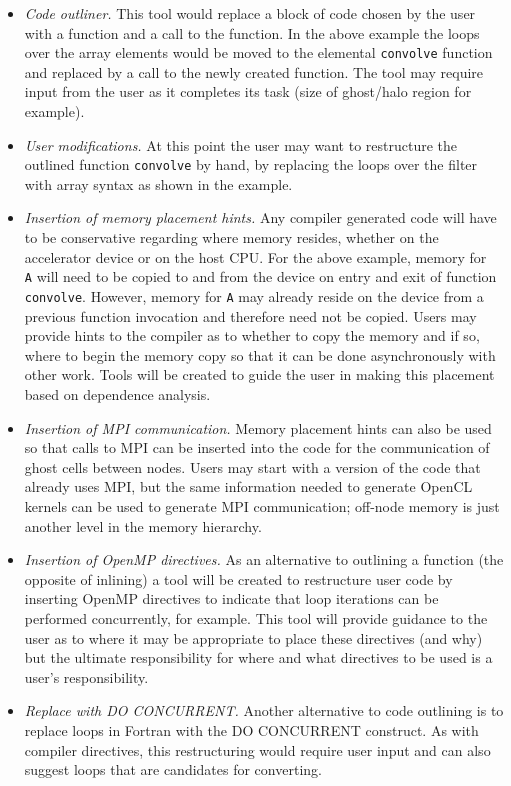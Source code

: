 \begin{itemize}

\item \emph{Code outliner.}  This tool would replace a block of code chosen by
the user with a function and a call to the function.  In the above example the
loops over the array elements would be moved to the elemental {\tt convolve}
function and replaced by a call to the newly created function.  The tool may
require input from the user as it completes its task (size of ghost/halo region
for example).

\item \emph{User modifications.} At this point the user may want to restructure
the outlined function {\tt convolve} by hand, by replacing the loops over the
filter with array syntax as shown in the example.

\item \emph{Insertion of memory placement hints.}  Any compiler generated code
will have to be conservative regarding where memory resides, whether on the
accelerator device or on the host CPU.  For the above example, memory for {\tt
A} will need to be copied to and from the device on entry and exit of function
{\tt convolve}.  However, memory for {\tt A} may already reside on the device
from a previous function invocation and therefore need not be copied.  Users may
provide hints to the compiler as to whether to copy the memory and if so, where
to begin the memory copy so that it can be done asynchronously with other work.
Tools will be created to guide the user in making this placement based on
dependence analysis.

\item \emph{Insertion of MPI communication.}  Memory placement hints can also be
used so that calls to MPI can be inserted into the code for the communication of
ghost cells between nodes.  Users may start with a version of the code that
already uses MPI, but the same information needed to generate OpenCL kernels can
be used to generate MPI communication; off-node memory is just another level in
the memory hierarchy.


\item \emph{Insertion of OpenMP directives.}  As an alternative to outlining a
function (the opposite of inlining) a tool will be created to restructure user
code by inserting OpenMP directives to indicate that loop iterations can be
performed concurrently, for example.  This tool will provide guidance to the
user as to where it may be appropriate to place these directives (and why) but
the ultimate responsibility for where and what directives to be used is a user's
responsibility.

\item \emph{Replace with DO CONCURRENT.}  Another alternative to code outlining
is to replace loops in Fortran with the DO CONCURRENT construct.  As with
compiler directives, this restructuring would require user input and can also
suggest loops that are candidates for converting.

\end{itemize}

